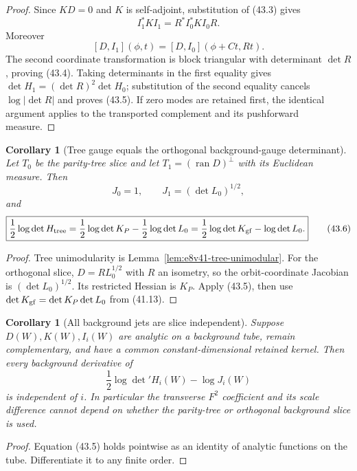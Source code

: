 \documentclass[11pt,oneside]{book}
\newtheorem{corollary}[theorem]{Corollary}
\theoremstyle{definition}
\theoremstyle{remark}
\begin{document}
\begin{proof}
Since \(KD=0\) and \(K\) is self-adjoint, substitution of (43.3)
gives
\[
 I_1^*KI_1=R^*I_0^*KI_0R.
\]
Moreover
\[
 [D,I_1](\phi,t)
 =[D,I_0](\phi+Ct,Rt).
\]
The second coordinate transformation is block triangular with
determinant \(\det R\), proving (43.4).  Taking determinants in the
first equality gives
\(\det H_1=(\det R)^2\det H_0\); substitution of the second equality
cancels \(\log|\det R|\) and proves (43.5).  If zero modes are
retained first, the identical argument applies to the transported
complement and its pushforward measure.
\end{proof}

\begin{corollary}[Tree gauge equals the orthogonal background-gauge
determinant]
\label{cor:e8v43-tree-orthogonal}
Let \(T_0\) be the parity-tree slice and let
\(T_1=(\operatorname{ran}D)^\perp\) with its Euclidean measure.
Then
\[
 J_0=1,\qquad J_1=(\det L_0)^{1/2},
\]
and
\[
 \boxed{
 \frac12\log\det H_{\rm tree}
 =\frac12\log\det K_P-\frac12\log\det L_0
 =\frac12\log\det K_{\rm gf}-\log\det L_0.}                     \tag{43.6}
\]
\end{corollary}

\begin{proof}
Tree unimodularity is
Lemma~\ref{lem:e8v41-tree-unimodular}.  For the orthogonal slice,
\(D=RL_0^{1/2}\) with \(R\) an isometry, so the orbit-coordinate
Jacobian is \((\det L_0)^{1/2}\).  Its restricted Hessian is \(K_P\).
Apply (43.5), then use
\(\det K_{\rm gf}=\det K_P\det L_0\) from (41.13).
\end{proof}

\begin{corollary}[All background jets are slice independent]
\label{cor:e8v43-background-jets}
Suppose \(D(W),K(W),I_i(W)\) are analytic on a background tube,
remain complementary, and have a common constant-dimensional
retained kernel.  Then every background derivative of
\[
 \frac12\log\det{}'H_i(W)-\log J_i(W)                           \tag{43.7}
\]
is independent of \(i\).  In particular the transverse \(F^2\)
coefficient and its scale difference cannot depend on whether the
parity-tree or orthogonal background slice is used.
\end{corollary}

\begin{proof}
Equation (43.5) holds pointwise as an identity of analytic functions
on the tube.  Differentiate it to any finite order.
\end{proof}
\end{document}
